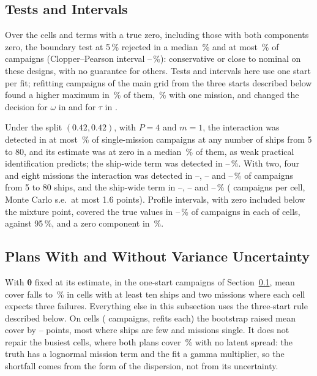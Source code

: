 \subsection{Tests and Intervals}
\label{sec:tests}
Over the \ceTypeCells{} cells and terms with a true zero, including those
with both components zero, the boundary test at 5\,\% rejected in a median \ceTypeMed\,\% and at most \ceTypeMax\,\% of
campaigns (Clopper--Pearson interval \ceTypeMaxLo--\ceTypeMaxHi\,\%):
conservative or close to nominal on these designs, with no guarantee for
others. Tests and intervals here use one start per fit; refitting \csN{}
campaigns of the main grid from the three starts described below found a higher maximum in \csHigherPct\,\% of them, \csHigherOnePct\,\% with
one mission, and changed the decision for $\omega$ in \csOmChanged{} and for
$\tau$ in \csTauChanged.

Under the split $(0.42,0.42)$, with $P=4$ and $m=1$, the interaction was
detected in at most \ceOnePowOm\,\% of single-mission campaigns at any number
of ships from 5 to 80, and its estimate was at zero in a median
\ceOneBound\,\% of them, as weak practical identification predicts; the
ship-wide term was detected in \ceOnePowTauLo--\ceOnePowTauHi\,\%. With two,
four and eight missions the interaction was detected in
\pwOmTwoLo--\pwOmTwoHi, \pwOmFourLo--\pwOmFourHi{} and
\pwOmEightLo--\pwOmEightHi\,\% of campaigns from 5 to 80 ships, and the
ship-wide term in \pwTauTwoLo--\pwTauTwoHi, \pwTauFourLo--\pwTauFourHi{} and
\pwTauEightLo--\pwTauEightHi\,\% (\cdReps{} campaigns per cell, Monte Carlo
s.e.\ at most 1.6 points). Profile intervals, with zero included below
the mixture point, covered the true values in \ceCiCorrLo--\ceCiCorrHi\,\% of
\ceCiReps{} campaigns in each of \ceCiCells{} cells, against 95\,\%, and a zero
component in \ceCiZeroCorr\,\%.

\subsection{Plans With and Without Variance Uncertainty}
With $\boldsymbol\theta$ fixed at its estimate, in the one-start campaigns of
Section~\ref{sec:tests}, mean cover falls to \cePredMinTen\,\% in cells with at least
ten ships and two missions where each cell expects three failures. Everything
else in this subsection uses the three-start rule described below. On
\cbCells{} cells (\cbReps{} campaigns, \cbB{} refits each) the bootstrap
raised mean cover by \cbGainLo--\cbGainHi{} points, most where ships are few
and missions single. It does not repair the busiest cells, where both plans
cover \cbNullPred\,\% with no latent spread: the truth has a lognormal mission
term and the fit a gamma multiplier, so the shortfall comes from the form of
the dispersion, not from its uncertainty.

